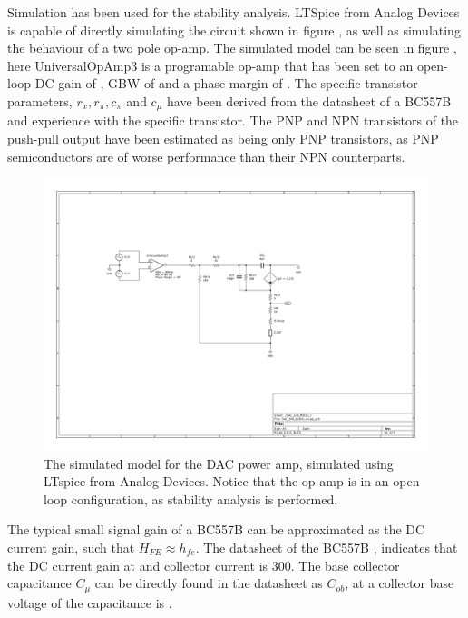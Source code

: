 Simulation has been used for the stability analysis. LTSpice from Analog Devices is capable of directly simulating the circuit shown in figure , as well as simulating the behaviour of a two pole op-amp. The simulated model can be seen in figure , here UniversalOpAmp3 is a programable op-amp that has been set to an open-loop DC gain of , GBW of  and a phase margin of . The specific transistor parameters, $r_x, r_\pi, c_\pi$ and $c_\mu$ have been derived from the datasheet of a BC557B and experience with the specific transistor. The PNP and NPN transistors of the push-pull output have been estimated as being only PNP transistors, as PNP semiconductors are of worse performance than their NPN counterparts. 

\begin{figure}[H]
    \centering
    \includegraphics[clip, trim=130 200 220 150, width=1\textwidth]{Sections/7_SystemDesign/Figures/7_1_1_5_DAC_FILTER-DAC_SIM_MODEL.pdf}
    \caption{The simulated model for the DAC power amp, simulated using LTspice from Analog Devices. Notice that the op-amp is in an open loop configuration, as stability analysis is performed.}
    \label{fig_7_1_1_5_DAC_POWER_AMP_SIM}
\end{figure}

The typical small signal gain of a BC557B can be approximated as the DC current gain, such that $H_{FE} \approx h_{fe}$. The datasheet of the BC557B \cite{BC557_datasheet}, indicates that the DC current gain at  and  collector current is 300. The base collector capacitance $C_\mu$ can be directly found in the datasheet as $C_{ob}$, at a collector base voltage of  the capacitance is . 

